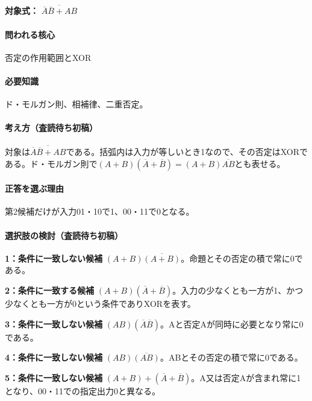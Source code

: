 \noindent\textbf{対象式：} \(\overline{\overline A\overline B+AB}\)\par

\paragraph{問われる核心} 否定の作用範囲とXOR

\paragraph{必要知識} ド・モルガン則、相補律、二重否定。

\paragraph{考え方（査読待ち初稿）} 対象は\(\overline{\overline A\overline B+AB}\)である。括弧内は入力が等しいとき1なので、その否定はXORである。ド・モルガン則で\((A+B)(\overline A+\overline B)=(A+B)\overline{AB}\)とも表せる。

\paragraph{正答を選ぶ理由} 第2候補だけが入力01・10で1、00・11で0となる。

\paragraph{選択肢の検討（査読待ち初稿）}\mbox{}\par

\noindent\textbf{1：条件に一致しない候補} \((A+B)\overline{(A+B)}\)。命題とその否定の積で常に0である。\par

\noindent\textbf{2：条件に一致する候補} \((A+B)(\overline A+\overline B)\)。入力の少なくとも一方が1、かつ少なくとも一方が0という条件でありXORを表す。\par

\noindent\textbf{3：条件に一致しない候補} \((AB)(\overline A\overline B)\)。Aと否定Aが同時に必要となり常に0である。\par

\noindent\textbf{4：条件に一致しない候補} \((AB)\overline{(AB)}\)。ABとその否定の積で常に0である。\par

\noindent\textbf{5：条件に一致しない候補} \((A+B)+(\overline A+\overline B)\)。A又は否定Aが含まれ常に1となり、00・11での指定出力0と異なる。\par

